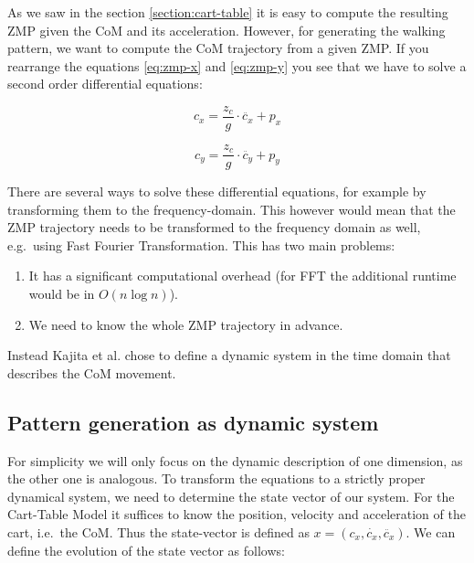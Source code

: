 \documentclass[english,ngerman]{KITreprt}
\begin{document}
As we saw in the section \ref{section:cart-table} it is easy to compute
the resulting ZMP given the CoM and its acceleration. However, for
generating the walking pattern, we want to compute the CoM trajectory
from a given ZMP. If you rearrange the equations \ref{eq:zmp-x} and
\ref{eq:zmp-y} you see that we have to solve a second order differential
equations:

\begin{equation} \label{eq:com-x}
c_x = \frac{z_c}{g} \cdot \ddot{c_x} + p_x
\end{equation}

\begin{equation} \label{eq:com-y}
c_y = \frac{z_c}{g} \cdot \ddot{c_y} + p_y
\end{equation}

There are several ways to solve these differential equations, for
example by transforming them to the frequency-domain. This however would
mean that the ZMP trajectory needs to be transformed to the frequency
domain as well, e.g.~using Fast Fourier Transformation. This has two
main problems:

\begin{enumerate}
\def\labelenumi{\arabic{enumi}.}
\item
  It has a significant computational overhead (for FFT the additional
  runtime would be in $O(n \log n)$).
\item
  We need to know the whole ZMP trajectory in advance.
\end{enumerate}

Instead Kajita et al. chose to define a dynamic system in the time
domain that describes the CoM movement.

\subsection{Pattern generation as dynamic
system}\label{pattern-generation-as-dynamic-system}

For simplicity we will only focus on the dynamic description of one
dimension, as the other one is analogous. To transform the equations to
a strictly proper dynamical system, we need to determine the state
vector of our system. For the Cart-Table Model it suffices to know the
position, velocity and acceleration of the cart, i.e.~the CoM. Thus the
state-vector is defined as $x = (c_x, \dot{c_x}, \ddot{c_x})$. We can
define the evolution of the state vector as follows:
\end{document}
